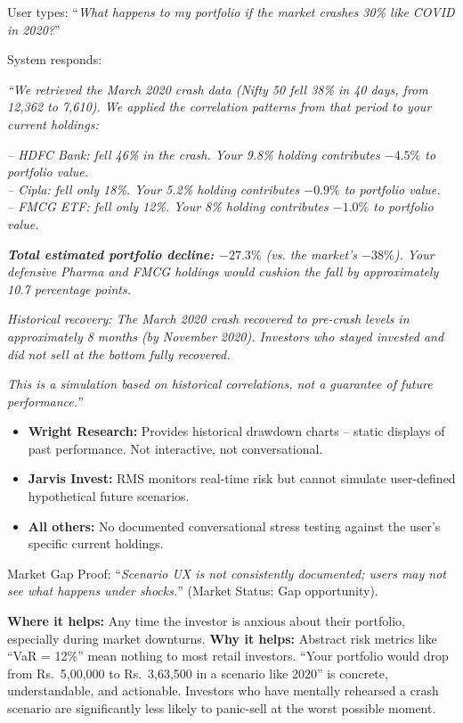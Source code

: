 \documentclass[12pt, a4paper, openany, oneside]{report}
\newcommand{\rupee}{Rs.~}
\begin{document}
\begin{examplebox}
User types: ``\textit{What happens to my portfolio if the market crashes 30\% like COVID in 2020?}''

System responds:

\textit{``We retrieved the March 2020 crash data (Nifty 50 fell 38\% in 40 days, from 12,362 to 7,610). We applied the correlation patterns from that period to your current holdings:}

\textit{-- HDFC Bank: fell 46\% in the crash. Your 9.8\% holding contributes $-4.5\%$ to portfolio value.}\\
\textit{-- Cipla: fell only 18\%. Your 5.2\% holding contributes $-0.9\%$ to portfolio value.}\\
\textit{-- FMCG ETF: fell only 12\%. Your 8\% holding contributes $-1.0\%$ to portfolio value.}

\textit{\textbf{Total estimated portfolio decline: $-27.3\%$} (vs. the market's $-38\%$). Your defensive Pharma and FMCG holdings would cushion the fall by approximately 10.7 percentage points.}

\textit{Historical recovery: The March 2020 crash recovered to pre-crash levels in approximately 8 months (by November 2020). Investors who stayed invested and did not sell at the bottom fully recovered.}

\textit{This is a simulation based on historical correlations, not a guarantee of future performance.''}
\end{examplebox}

\begin{gapbox}
\begin{itemize}[noitemsep]
  \item \textbf{Wright Research:} Provides historical drawdown charts -- static displays of past performance. Not interactive, not conversational.
  \item \textbf{Jarvis Invest:} RMS monitors real-time risk but cannot simulate user-defined hypothetical future scenarios.
  \item \textbf{All others:} No documented conversational stress testing against the user's specific current holdings.
\end{itemize}
Market Gap Proof: ``\textit{Scenario UX is not consistently documented; users may not see what happens under shocks.}'' (Market Status: Gap opportunity).
\end{gapbox}

\begin{valuebox}
\textbf{Where it helps:} Any time the investor is anxious about their portfolio, especially during market downturns. \textbf{Why it helps:} Abstract risk metrics like ``VaR = 12\%'' mean nothing to most retail investors. ``Your portfolio would drop from \rupee5,00,000 to \rupee3,63,500 in a scenario like 2020'' is concrete, understandable, and actionable. Investors who have mentally rehearsed a crash scenario are significantly less likely to panic-sell at the worst possible moment.
\end{valuebox}
\end{document}
